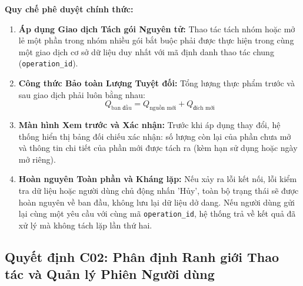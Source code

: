 \documentclass[10pt,a4paper]{article}
\begin{document}
\textbf{Quy chế phê duyệt chính thức:}
\begin{enumerate}[itemsep=2pt]
    \item \textbf{Áp dụng Giao dịch Tách gói Nguyên tử:} Thao tác tách nhóm hoặc mở lẻ một phần trong nhóm nhiều gói bắt buộc phải được thực hiện trong cùng một giao dịch cơ sở dữ liệu duy nhất với mã định danh thao tác chung (\texttt{operation\_id}).
    \item \textbf{Công thức Bảo toàn Lượng Tuyệt đối:} Tổng lượng thực phẩm trước và sau giao dịch phải luôn bằng nhau:
    \[
    Q_{\text{ban đầu}} = Q_{\text{nguồn mới}} + Q_{\text{đích mới}}
    \]
    \item \textbf{Màn hình Xem trước và Xác nhận:} Trước khi áp dụng thay đổi, hệ thống hiển thị bảng đối chiếu xác nhận: số lượng còn lại của phần chưa mở và thông tin chi tiết của phần mới được tách ra (kèm hạn sử dụng hoặc ngày mở riêng).
    \item \textbf{Hoàn nguyên Toàn phần và Kháng lặp:} Nếu xảy ra lỗi kết nối, lỗi kiểm tra dữ liệu hoặc người dùng chủ động nhấn 'Hủy', toàn bộ trạng thái sẽ được hoàn nguyên về ban đầu, không lưu lại dữ liệu dở dang. Nếu người dùng gửi lại cùng một yêu cầu với cùng mã \texttt{operation\_id}, hệ thống trả về kết quả đã xử lý mà không tách lặp lần thứ hai.
\end{enumerate}

\subsection{Quyết định C02: Phân định Ranh giới Thao tác và Quản lý Phiên Người dùng}
\end{document}
